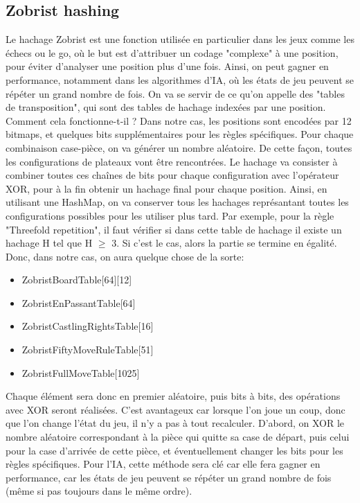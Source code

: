\documentclass{article}
\begin{document}
\subsection{Zobrist hashing} \label{Zobrist}
Le hachage Zobrist est une fonction utilisée en particulier dans les jeux comme les échecs ou le go, où le but est d'attribuer un codage "complexe" à
une position, pour éviter d'analyser une position plus d'une fois. Ainsi, on peut gagner en performance, notamment dans les algorithmes d'IA, où les
états de jeu peuvent se répéter un grand nombre de fois. On va se servir de ce qu'on appelle des "tables de transposition", qui sont des tables de
hachage indexées par une position. Comment cela fonctionne-t-il ? Dans notre cas, les positions sont encodées par 12 bitmaps, et quelques bits
supplémentaires pour les règles spécifiques. Pour chaque combinaison case-pièce, on va générer un nombre aléatoire. De cette façon, toutes les configurations
de plateaux vont être rencontrées. Le hachage va consister à combiner toutes ces chaînes de bits pour chaque configuration avec l'opérateur XOR,
pour à la fin obtenir un hachage final pour chaque position. Ainsi, en utilisant une HashMap, on va conserver tous les hachages représantant toutes les
configurations possibles pour les utiliser plus tard. Par exemple, pour la règle "Threefold repetition", il faut vérifier si dans cette table de hachage
il existe un hachage H tel que H $\ge$ 3. Si c'est le cas, alors la partie se termine en égalité.
\\Donc, dans notre cas, on aura quelque chose de la sorte:\\
\begin{itemize}
    \item ZobristBoardTable[64][12]
    \item ZobristEnPassantTable[64]
    \item ZobristCastlingRightsTable[16]
    \item ZobristFiftyMoveRuleTable[51]
    \item ZobristFullMoveTable[1025]
\end{itemize}

\par Chaque élément sera donc en premier aléatoire, puis bits à bits, des opérations avec XOR seront réalisées. C'est avantageux car lorsque l'on joue
un coup, donc que l'on change l'état du jeu, il n'y a pas à tout recalculer. D'abord, on XOR le nombre aléatoire correspondant à la pièce qui quitte
sa case de départ, puis celui pour la case d'arrivée de cette pièce, et éventuellement changer les bits pour les règles spécifiques.
Pour l'IA, cette méthode sera clé car elle fera gagner en performance, car les états de jeu peuvent se répéter un grand nombre de fois (même si pas
toujours dans le même ordre).
\end{document}
